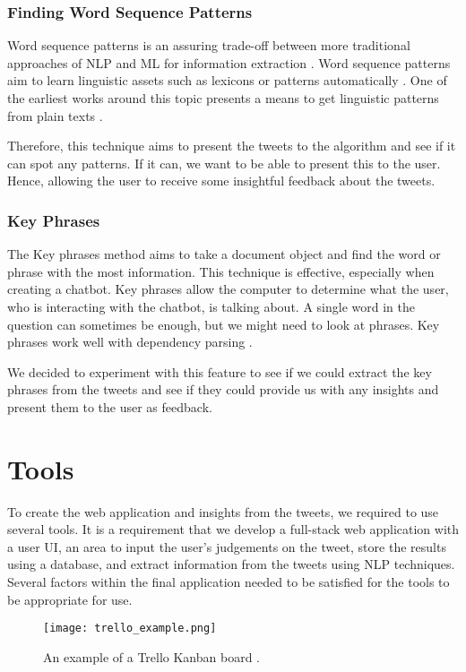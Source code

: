 	\subsubsection{Finding Word Sequence Patterns}
	Word sequence patterns is an assuring trade-off between more traditional approaches of NLP and ML for information extraction \cite{bechet2012discovering}. Word sequence patterns aim to learn linguistic assets such as lexicons or patterns automatically \cite{nedellec2004machine}. One of the earliest works around this topic presents a means to get linguistic patterns from plain texts \cite{riloff1996automatically}.
	
	Therefore, this technique aims to present the tweets to the algorithm and see if it can spot any patterns. If it can, we want to be able to present this to the user. Hence, allowing the user to receive some insightful feedback about the tweets. 
	
	\subsubsection{Key Phrases}
	The Key phrases method aims to take a document object and find the word or phrase with the most information. This technique is effective, especially when creating a chatbot. Key phrases allow the computer to determine what the user, who is interacting with the chatbot, is talking about. A single word in the question can sometimes be enough, but we might need to look at phrases. Key phrases work well with dependency parsing \cite{vasiliev2020natural}.
	
	We decided to experiment with this feature to see if we could extract the key phrases from the tweets and see if they could provide us with any insights and present them to the user as feedback.
	
	\section{Tools}
	To create the web application and insights from the tweets, we required to use several tools. It is a requirement that we develop a full-stack web application with a user UI, an area to input the user's judgements on the tweet, store the results using a database, and extract information from the tweets using NLP techniques. Several factors within the final application needed to be satisfied for the tools to be appropriate for use.
	
	
	\begin{figure}[h]
		\centering
		\texttt{[image: trello\_example.png]}
		\caption{An example of a Trello Kanban board \cite{trello_blog}.}
		\label{fig:trello}
		
	\end{figure} 
	
